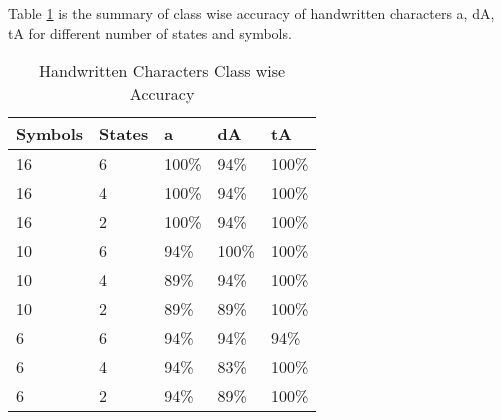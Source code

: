 Table \ref{table:3} is the summary of class wise accuracy of handwritten characters a, dA, tA for different number of states and symbols.

\hspace*{-1cm}\begin{table}[h]
\centering
\begin{tabular}{|l|l|l|l|l|}
	 \hline
\textbf{Symbols} & \textbf{States} & \textbf{a} & \textbf{dA} & \textbf{tA} \\ \hline \hline
16               & 6               & 100\%          & 94\%        & 100\%           \\ \hline
16               & 4               & 100\%         & 94\%        & 100\%      \\ \hline
16               & 2               & 100\%         & 94\%        & 100\%           \\ \hline
10               & 6               & 94\%      & 100\%           & 100\%          \\ \hline
10               & 4               & 89\%       & 94\%        & 100\%        \\ \hline
10               & 2               & 89\%       & 89\%        & 100\%           \\ \hline
6                & 6               & 94\%       & 94\%      & 94\%        \\ \hline
6                & 4               & 94\%       & 83\%        & 100\%           \\ \hline
6                & 2               & 94\%       & 89\%        & 100\%           \\
 \hline
\end{tabular}\hspace*{-1cm}
\caption{Handwritten Characters Class wise Accuracy}
\label{table:3}
\end{table}